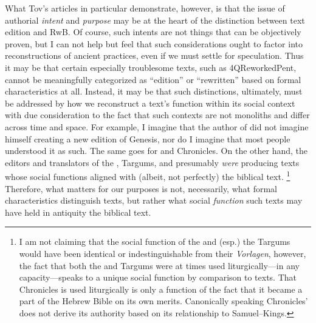 What Tov's articles in particular demonstrate, however, is that the issue of authorial \emph{intent} and \emph{purpose} may be at the heart of the distinction between text edition and RwB. Of course, such intents are not things that can be objectively proven, but I can not help but feel that such considerations ought to factor into reconstructions of ancient practices, even if we must settle for speculation. Thus it may be that certain especially troublesome texts, such as 4QReworkedPent, cannot be meaningfully categorized as ``edition'' or ``rewritten'' based on formal characteristics at all. Instead, it may be that such distinctions, ultimately, must be addressed by how we reconstruct a text's function within its social context with due consideration to the fact that such contexts are not monoliths and differ across time and space. For example, I imagine that the author of \ga did not imagine himself creating a new edition of Genesis, nor do I imagine that most people understood it as such. The same goes for \jub and Chronicles. On the other hand, the editors and translators of the \sampent, Targums, and \lxx presumably \emph{were} producing texts whose social functions aligned with (albeit, not perfectly) the biblical text.%
%
\footnote{I am not claiming that the social function of the \lxx and (esp.) the Targums would have been identical or indestinguishable from their \emph{Vorlagen}, however, the fact that both the \lxx and Targums were at times used liturgically---in any capacity---speaks to a unique social function by comparison to \rwb texts. That Chronicles is used liturgically is only a function of the fact that it became a part of the Hebrew Bible on its own merits. Canonically speaking Chronicles' does not derive its authority based on its relationship to Samuel--Kings.}
%
Therefore, what matters for our purposes is not, necessarily, what formal characteristics distinguish \rwb texts, but rather what social \emph{function} such texts may have held in antiquity \visavis the biblical text.